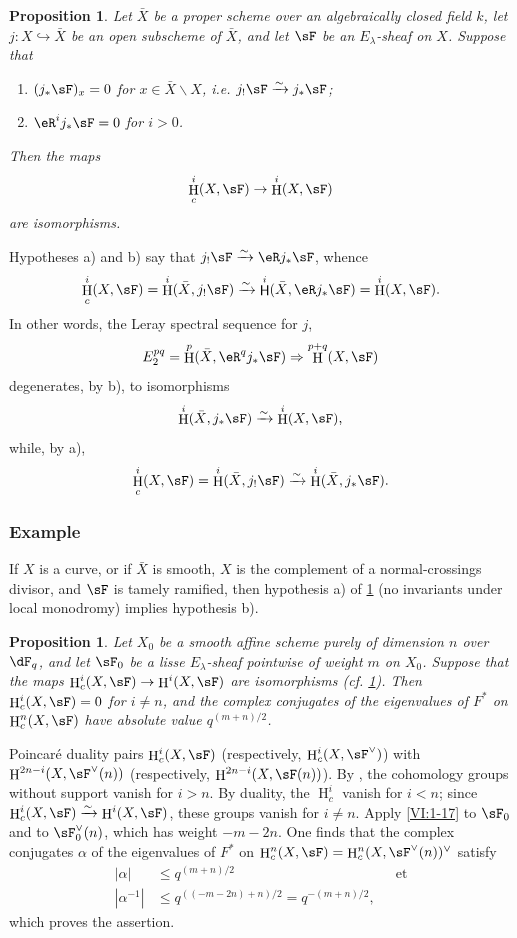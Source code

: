 \documentclass[12pt,oneside,english]{smfbook}
\DeclareMathOperator{\h}{H}
\DeclareMathOperator{\hh}{\mathsf{H}} %
\newcommand{\iso}{\xrightarrow\sim}
\renewcommand{\setminus}{\smallsetminus}
\newtheorem{proposition_}[subsection]{Proposition}
\begin{document}
\begin{proposition_}\label{VI:1-19}
Let $\bar X$ be a proper scheme over an algebraically closed field $k$, let $j:X\hookrightarrow\bar X$ be an open subscheme of $\bar X$, and let $\sF$ be an $E_\lambda$-sheaf on $X$. Suppose that
\begin{enumerate}[\indent a)]
  \item $(j_\ast\sF)_x=0$ for $x\in\bar X\setminus X$, i.e. $j_!\sF\iso j_*\sF$;
  \item $\eR^ij_\ast\sF=0$ for $i>0$.
\end{enumerate}
Then the maps
\[
  \h_c^i(X,\sF) \to \h^i(X,\sF)
\]
are isomorphisms.
\end{proposition_}

Hypotheses a) and b) say that $j_!\sF\iso\eR j_*\sF$, whence
\[
  \h_c^i(X,\sF) = \h^i(\bar X,j_!\sF) \iso \hh^i(\bar X,\eR j_\ast \sF) = \h^i(X,\sF) \text{.}
\]
In other words, the Leray spectral sequence for $j$,
\[
  E_2^{pq} = \h^p(\bar X,\eR^q j_\ast \sF) \Rightarrow \h^{p+q}(X,\sF)
\]
degenerates, by b), to isomorphisms
\[
  \h^i(\bar X,j_\ast\sF) \iso \h^i(X,\sF) \text{,}
\]
while, by a),
\[
  \h_c^i(X,\sF) = \h^i(\bar X,j_!\sF) \iso \h^i(\bar X,j_\ast\sF) \text{.}
\]

\subsubsection{Example}\label{VI:1-19-1}

If $X$ is a curve, or if $\bar X$ is smooth, $X$ is the complement of a normal-crossings divisor, and $\sF$ is tamely ramified, then hypothesis a) of \ref{VI:1-19} (no invariants under local monodromy) implies hypothesis b).

\begin{proposition_}\label{VI:1-20}
Let $X_0$ be a smooth affine scheme purely of dimension $n$ over $\dF_q$, and let $\sF_0$ be a lisse $E_\lambda$-sheaf pointwise of weight $m$ on $X_0$. Suppose that the maps $\h_c^i(X,\sF)\to\h^i(X,\sF)$ are isomorphisms (cf. \ref{VI:1-19}). Then $\h_c^i(X,\sF)=0$ for $i\ne n$, and the complex conjugates of the eigenvalues of $F^\ast$ on $\h_c^n(X,\sF)$ have absolute value $q^{(m+n)/2}$.
\end{proposition_}

Poincaré duality pairs $\h_c^i(X,\sF)$ (respectively, $\h_c^i(X,\sF^\vee)$) with $\h^{2n-i}(X,\sF^\vee(n))$ (respectively, $\h^{2n-i}(X,\sF(n))$). By \cite[XIV 3.2]{sga4}, the cohomology groups without support vanish for $i>n$. By duality, the $\h_c^i$ vanish for $i<n$; since $\h_c^i(X,\sF)\iso\h^i(X,\sF)$, these groups vanish for $i\ne n$. Apply \ref{VI:1-17} to $\sF_0$ and to $\sF_0^\vee(n)$, which has weight $-m-2n$. One finds that the complex conjugates $\alpha$ of the eigenvalues of $F^\ast$ on $\h_c^n(X,\sF)=\h_c^n(X,\sF^\vee(n))^\vee$ satisfy
\begin{align*}
  |\alpha| &\leqslant q^{(m+n)/2} && \text{et} \\
  |\alpha^{-1}| &\leqslant q^{((-m-2n)+n)/2} = q^{-(m+n)/2} \text{,}
\end{align*}
which proves the assertion.
\end{document}
